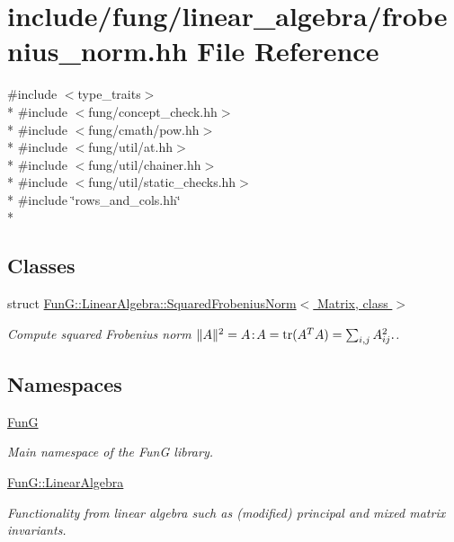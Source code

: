 \hypertarget{frobenius__norm_8hh}{\section{include/fung/linear\-\_\-algebra/frobenius\-\_\-norm.hh File Reference}
\label{frobenius__norm_8hh}
}
{\ttfamily \#include $<$type\-\_\-traits$>$}\\*
{\ttfamily \#include $<$fung/concept\-\_\-check.\-hh$>$}\\*
{\ttfamily \#include $<$fung/cmath/pow.\-hh$>$}\\*
{\ttfamily \#include $<$fung/util/at.\-hh$>$}\\*
{\ttfamily \#include $<$fung/util/chainer.\-hh$>$}\\*
{\ttfamily \#include $<$fung/util/static\-\_\-checks.\-hh$>$}\\*
{\ttfamily \#include \char`\"{}rows\-\_\-and\-\_\-cols.\-hh\char`\"{}}\\*
\subsection*{Classes}
\begin{DoxyCompactItemize}
\item 
struct \hyperlink{structFunG_1_1LinearAlgebra_1_1SquaredFrobeniusNorm}{Fun\-G\-::\-Linear\-Algebra\-::\-Squared\-Frobenius\-Norm$<$ Matrix, class $>$}
\begin{DoxyCompactList}\small\item\em Compute squared Frobenius norm $ \|A\|^2 = A\negthinspace : \negthinspace A = \mathrm{tr}(A^TA) = \sum_{i,j} A_{ij}^2. $. \end{DoxyCompactList}\end{DoxyCompactItemize}
\subsection*{Namespaces}
\begin{DoxyCompactItemize}
\item 
\hyperlink{namespaceFunG}{Fun\-G}
\begin{DoxyCompactList}\small\item\em Main namespace of the Fun\-G library. \end{DoxyCompactList}\item 
\hyperlink{namespaceFunG_1_1LinearAlgebra}{Fun\-G\-::\-Linear\-Algebra}
\begin{DoxyCompactList}\small\item\em Functionality from linear algebra such as (modified) principal and mixed matrix invariants. \end{DoxyCompactList}\end{DoxyCompactItemize}
